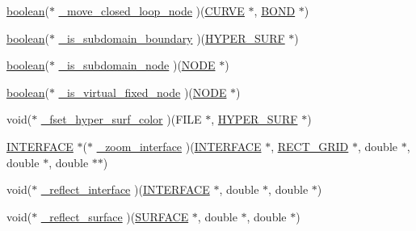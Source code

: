 \begin{DoxyCompactItemize}
\item 
\hyperlink{cdecs_8h_ad048433382a936258fb49e2ec4f148e1}{boolean}($\ast$ \hyperlink{struct___i___u_s_e_r___i_n_t_e_r_f_a_c_e_aa73d71df65cf672488dab47fefb10a1f}{\+\_\+move\+\_\+closed\+\_\+loop\+\_\+node} )(\hyperlink{int_8h_a4c1c272bef898dbaa20b055af85cd685}{C\+U\+R\+VE} $\ast$, \hyperlink{int_8h_a13b5a9ccac0e6d04386af2ef62582540}{B\+O\+ND} $\ast$)
\item 
\hyperlink{cdecs_8h_ad048433382a936258fb49e2ec4f148e1}{boolean}($\ast$ \hyperlink{struct___i___u_s_e_r___i_n_t_e_r_f_a_c_e_a1b63be46fee07e088f1ad91c766e4fc4}{\+\_\+is\+\_\+subdomain\+\_\+boundary} )(\hyperlink{int_8h_acef50fa4757ce0d3f75c97fab5a175bc}{H\+Y\+P\+E\+R\+\_\+\+S\+U\+RF} $\ast$)
\item 
\hyperlink{cdecs_8h_ad048433382a936258fb49e2ec4f148e1}{boolean}($\ast$ \hyperlink{struct___i___u_s_e_r___i_n_t_e_r_f_a_c_e_a538be11b7cc64de82b7192ea6c2bc5a2}{\+\_\+is\+\_\+subdomain\+\_\+node} )(\hyperlink{int_8h_a65acc517559b106aa8e5fe339247ddcd}{N\+O\+DE} $\ast$)
\item 
\hyperlink{cdecs_8h_ad048433382a936258fb49e2ec4f148e1}{boolean}($\ast$ \hyperlink{struct___i___u_s_e_r___i_n_t_e_r_f_a_c_e_af6e363c7a3b7497b2230d9f7bfc2fdb5}{\+\_\+is\+\_\+virtual\+\_\+fixed\+\_\+node} )(\hyperlink{int_8h_a65acc517559b106aa8e5fe339247ddcd}{N\+O\+DE} $\ast$)
\item 
void($\ast$ \hyperlink{struct___i___u_s_e_r___i_n_t_e_r_f_a_c_e_a763fbf4b1742070464926a4968509c57}{\+\_\+fset\+\_\+hyper\+\_\+surf\+\_\+color} )(F\+I\+LE $\ast$, \hyperlink{int_8h_acef50fa4757ce0d3f75c97fab5a175bc}{H\+Y\+P\+E\+R\+\_\+\+S\+U\+RF} $\ast$)
\item 
\hyperlink{int_8h_a58cf562d0d320a608294b7310ea167dc}{I\+N\+T\+E\+R\+F\+A\+CE} $\ast$($\ast$ \hyperlink{struct___i___u_s_e_r___i_n_t_e_r_f_a_c_e_a61c4564c33edd1fc7aa3dd452d42b23d}{\+\_\+zoom\+\_\+interface} )(\hyperlink{int_8h_a58cf562d0d320a608294b7310ea167dc}{I\+N\+T\+E\+R\+F\+A\+CE} $\ast$, \hyperlink{geom_8h_a983fdb6b46c9b99969bffa62eae7d31d}{R\+E\+C\+T\+\_\+\+G\+R\+ID} $\ast$, double $\ast$, double $\ast$, double $\ast$$\ast$)
\item 
void($\ast$ \hyperlink{struct___i___u_s_e_r___i_n_t_e_r_f_a_c_e_a88e9216376fc8592db49aa780b952e5f}{\+\_\+reflect\+\_\+interface} )(\hyperlink{int_8h_a58cf562d0d320a608294b7310ea167dc}{I\+N\+T\+E\+R\+F\+A\+CE} $\ast$, double $\ast$, double $\ast$)
\item 
void($\ast$ \hyperlink{struct___i___u_s_e_r___i_n_t_e_r_f_a_c_e_a0cf298092f520eb7d27e4658de9cf368}{\+\_\+reflect\+\_\+surface} )(\hyperlink{int_8h_a1520d8870b5eafd76bd401aecb121ffd}{S\+U\+R\+F\+A\+CE} $\ast$, double $\ast$, double $\ast$)
$$
\end{DoxyCompactItemize}
